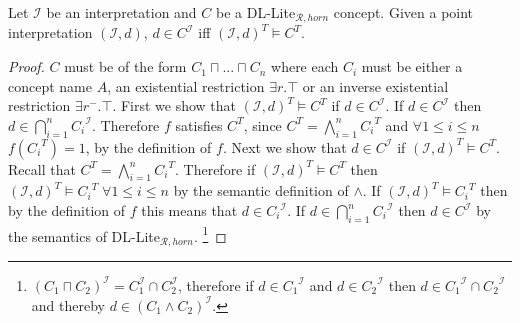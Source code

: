 \begin{lemma}
Let $\mathcal{I}$ be an interpretation and $C$ be a DL-Lite$_{\mathcal{R}, horn}$ concept. Given a point interpretation $(\mathcal{I}, d)$, $d \in C^{\mathcal{I}}$ iff $(\mathcal{I}, d)^T \models C^T$.
\end{lemma}

\begin{proof}
$C$ must be of the form $C_1 \sqcap ... \sqcap C_n$ where each  $C_i$ must be either a concept name $A$, an existential restriction $\exists r.\top$ or an inverse existential restriction $\exists r^{-}.\top$. \newline
First we show that $(\mathcal{I}, d)^T \models C^T$ if $d\in C^\mathcal{I}$.
\newline
If $d \in C^{\mathcal{I}}$ then $d\in \bigcap^{n}_{i=1}{C_{i}}^{\mathcal{I}}$. Therefore $f$ satisfies $C^T$, since $C^T = \bigwedge_{i = 1}^{n} {C_i}^T$ and $\forall 1 \leq i \leq n$ $f({C_i}^T) = 1$, by the definition of $f$.\newline
Next we show that $d\in C^\mathcal{I}$ if $(\mathcal{I}, d)^T \models C^T$.
\newline
Recall that $C^T = \bigwedge_{i = 1}^{n} {C_i}^T$. Therefore if $(\mathcal{I}, d)^T \models C^T$ then  $(\mathcal{I}, d) ^T \models {C_{i}}^T \; \forall 1 \leq i \leq n$ by the semantic definition of $\wedge$. If $(\mathcal{I}, d)^T \models {C_i }^T$ then by the definition of $f$ this means that $d\in{C_i}^\mathcal{I}$. If $d\in \bigcap^{n}_{i=1}{C_{i}}^{\mathcal{I}}$ then $d \in C^\mathcal{I}$ by the semantics of DL-Lite$_{\mathcal{R}, horn}$. \footnote{$ (C_{1} \sqcap C_{2})^{\mathcal{I}} = C_{1}^{\mathcal{I}} \cap C_{2}^{\mathcal{I}} $, therefore if $d\in {C_1}^\mathcal{I}$ and $d\in {C_2}^{\mathcal{I}}$ then $d\in {C_1}^\mathcal{I} \cap {C_2}^\mathcal{I}$ and thereby $d\in (C_1 \wedge C_2)^\mathcal{I}$.}
\end{proof}
